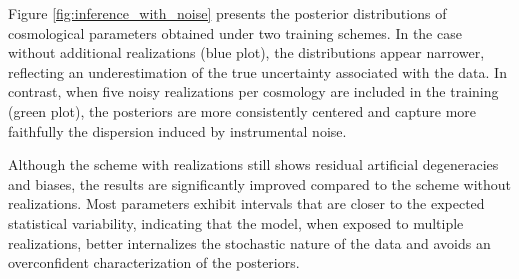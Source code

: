 Figure \ref{fig:inference_with_noise} presents the posterior distributions of cosmological parameters obtained under two training schemes. In the case without additional realizations (blue plot), the distributions appear narrower, reflecting an underestimation of the true uncertainty associated with the data. In contrast, when five noisy realizations per cosmology are included in the training (green plot), the posteriors are more consistently centered and capture more faithfully the dispersion induced by instrumental noise.

Although the scheme with realizations still shows residual artificial degeneracies and biases, the results are significantly improved compared to the scheme without realizations. Most parameters exhibit intervals that are closer to the expected statistical variability, indicating that the model, when exposed to multiple realizations, better internalizes the stochastic nature of the data and avoids an overconfident characterization of the posteriors.









